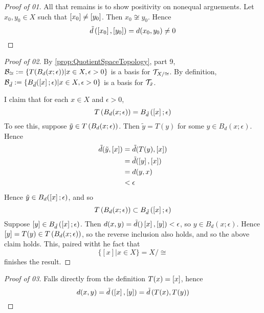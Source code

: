 \begin{prop}
\begin{proof}[Proof of 01]
         All that remains is to show positivity on nonequal arguements. Let $x_0, y_0 \in X$ such that $\left[ x_0 \right] \neq \left[ y_0 \right]$. Then $x_0 \not \cong y_0$. Hence \begin{equation*}
             \tilde{d}\left( \left[ x_0 \right], \left[ y_0 \right]\right)=d(x_0,y_0) \neq 0
             \end{equation*}
    \end{proof}
    \begin{proof}[Proof of 02]
        By \ref{prop:QuotientSpaceTopology}, part 9, $\mathcal{B}_{\cong}:=\{T(B_d(x;\epsilon)) | x \in X, \epsilon > 0\}$ is a basis for $\mathcal{T}_{X/\cong}$. 
        By definition, $\mathcal{B}_{\tilde{d}}:=\{B_{\tilde{d}}(\left[ x \right]; \epsilon) | x \in X , \epsilon > 0 \}$ is a basis for $\mathcal{T}_{\tilde{x}}$. 
        
        I claim that for each $x \in X$ and $\epsilon > 0$, 
        \begin{equation}
            T\left( B_d(x;\epsilon)\right) = B_{\tilde{d}} \left( \left[ x \right]; \epsilon\right)
        \end{equation}
        To see this, 
        suppose $\tilde{y} \in T\left( B_d(x;\epsilon)\right)$. 
        Then $\tilde{y}=T(y)$ for some $y \in B_d(x;\epsilon)$. 
        Hence 
        \begin{align*}
            \tilde{d}(\tilde{y},\left[ x \right])& =\tilde{d}(T(y),\left[ x \right])\\
            &=\tilde{d}(\left[ y \right],\left[ x \right])\\
            & = d(y,x) \\
            & < \epsilon
        \end{align*}
        Hence $\tilde{y} \in B_d(\left[ x \right] ; \epsilon)$, and so 
                \begin{equation}
            T\left( B_d(x;\epsilon)\right) \subset  B_{\tilde{d}} \left( \left[ x \right]; \epsilon\right)
        \end{equation}
        Suppose $\left[ y \right] \in B_{\tilde{d}}\left( \left[ x \right] ; \epsilon\right)$. 
        Then $d(x,y) = \tilde{d}()\left[ x \right],\left[ y \right]) < \epsilon$, so $y \in B_d(x; \epsilon)$. 
        Hence $[y]=T(y) \in T\left( B_d(x;\epsilon)\right)$, so the reverse inclusion also holds, and so the above claim holds. 
        This, paired witht he fact that 
        \begin{equation}
            \{[x] | x \in X\}= X/\cong
        \end{equation}
        finishes the result. 
        
    \end{proof}
    \begin{proof}[Proof of 03]
        Falls directly from the definition $T(x)=\left[ x \right]$, hence
        \begin{equation}
            d(x,y) = \tilde{d}\left( \left[ x \right], \left[ y \right]\right) = \tilde{d}\left( T(x), T(y)\right)
        \end{equation}
        

\end{proof}
\end{prop}

